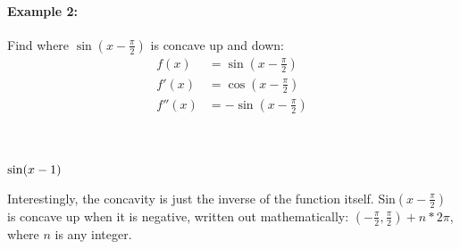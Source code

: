 \documentclass[../revisedmain.tex]{subfiles}
\begin{document}
\paragraph{Example 2:}Find where \(\sin(x-\frac{\pi}{2})\) is concave up and down:
\begin{equation}
	\begin{split}
	f(x)&=\sin(x-\frac{\pi}{2})\\
	f'(x)&=\cos(x-\frac{\pi}{2})\\
	f''(x)&=-\sin(x-\frac{\pi}{2})\\
	\end{split}
\end{equation}
	\\
\begin{center}
	\(\small{\sin(x-1)}\)
\end{center}
Interestingly, the concavity is just the inverse of the function itself. Sin\((x-\frac{\pi}{2})\) is concave up when it is negative, written out mathematically: \((-\frac{\pi}{2},\frac{\pi}{2})+n*2\pi\), where \(n\) is any integer.\\
\end{document}
